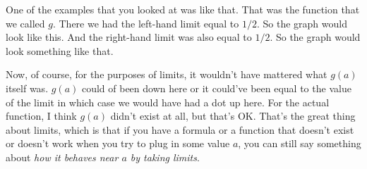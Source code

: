 \documentclass[pdftex, brazil, 12pt, twoside]{article}
\begin{document}
\begin{figure}[H]
  \begin{center}
  \end{center}
\end{figure}

One of the examples that you looked at was like that.
That was the function that we called $g$.
There we had the left-hand limit equal to $1/2$.
So the graph would look like this.
And the right-hand limit was also equal to $1/2$.
So the graph would look something like that.

\begin{figure}[H]
  \begin{center}
  \end{center}
\end{figure}

Now, of course, for the purposes of limits,
it wouldn't have mattered what $g(a)$ itself was.
$g(a)$ could of been down here or it
could've been equal to the value of the limit in which case
we would have had a dot up here.
For the actual function, I think $g(a)$ didn't exist at all,
but that's OK.
That's the great thing about limits,
which is that if you have a formula or a function that
doesn't exist or doesn't work when you try
to plug in some value $a$, you can still say something
about \emph{how it behaves near $a$ by taking limits}.
\end{document}
